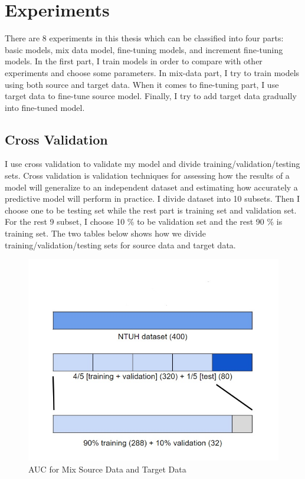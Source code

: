 \chapter{Experiments}
There are 8 experiments in this thesis which can be classified into four parts: basic models, mix data model, fine-tuning models, and increment fine-tuning models. In the first part, I train models in order to compare with other experiments and choose some parameters. In mix-data part, I try to train models using both source and target data. When it comes to fine-tuning part, I use target data to fine-tune source model. Finally, I try to add target data gradually into fine-tuned model.

\section{Cross Validation}
I use cross validation to validate my model and divide training/validation/testing sets. Cross validation is validation techniques for assessing how the results of a model will generalize to an independent dataset and estimating how accurately a predictive model will perform in practice. I divide dataset into 10 subsets. Then I choose one to be testing set while the rest part is training set and validation set. For the rest 9 subset, I choose 10 \% to be validation set and the rest 90 \% is training set. The two tables below shows how we divide training/validation/testing sets for source data and target data.


\begin{figure}[H]
    \hfil
    \begin{minipage}[t]{0.9\textwidth}
        \includegraphics[width=\textwidth]{fig/cross.png}
        \caption{\label{fig:parallel1} AUC for Mix Source Data and Target Data}
    \end{minipage}
    \hfil
\end{figure}
 
